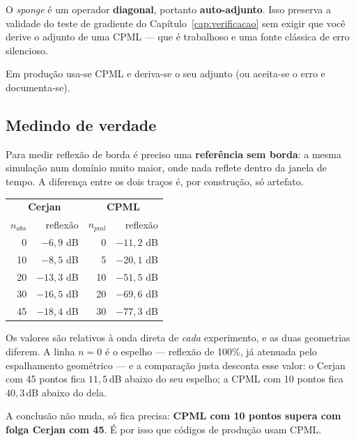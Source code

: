 \documentclass[11pt,a4paper,oneside]{report}
\begin{document}
\begin{pratica}
O \emph{sponge} \'e um operador \textbf{diagonal}, portanto \textbf{auto-adjunto}.
Isso preserva a validade do teste de gradiente do
Cap\'itulo~\ref{cap:verificacao} sem exigir que voc\^e derive o adjunto de uma
CPML --- que \'e trabalhoso e uma fonte cl\'assica de erro silencioso.

Em produ\c{c}\~ao usa-se CPML e deriva-se o seu adjunto (ou aceita-se o erro
e documenta-se).
\end{pratica}

\subsection*{Medindo de verdade}

Para medir reflex\~ao de borda \'e preciso uma \textbf{refer\^encia sem
borda}: a mesma simula\c{c}\~ao num dom\'inio muito maior, onde nada reflete
dentro da janela de tempo. A diferen\c{c}a entre os dois tra\c{c}os \'e, por
constru\c{c}\~ao, s\'o artefato.

\begin{center}
\begin{tabular}{@{}rrrr@{}}
\toprule
\multicolumn{2}{c}{\textbf{Cerjan}} & \multicolumn{2}{c}{\textbf{CPML}} \\
$n_{abs}$ & reflex\~ao & $n_{pml}$ & reflex\~ao \\
\midrule
0  & $-6{,}9$ dB  & 0  & $-11{,}2$ dB \\
10 & $-8{,}5$ dB  & 5  & $-20{,}1$ dB \\
20 & $-13{,}3$ dB & 10 & $-51{,}5$ dB \\
30 & $-16{,}5$ dB & 20 & $-69{,}6$ dB \\
45 & $-18{,}4$ dB & 30 & $-77{,}3$ dB \\
\bottomrule
\end{tabular}
\end{center}

\begin{atencao}
Os valores s\~ao relativos \`a onda direta de \emph{cada} experimento, e as
duas geometrias diferem. A linha $n=0$ \'e o espelho --- reflex\~ao de 100\%,
j\'a atenuada pelo espalhamento geom\'etrico --- e a compara\c{c}\~ao justa
desconta esse valor: o Cerjan com 45 pontos fica $11{,}5$\,dB abaixo do seu
espelho; a CPML com 10 pontos fica $40{,}3$\,dB abaixo do dela.

A conclus\~ao n\~ao muda, s\'o fica precisa: \textbf{CPML com 10 pontos supera
com folga Cerjan com 45}. \'E por isso que c\'odigos de produ\c{c}\~ao usam
CPML.
\end{atencao}
\end{document}

